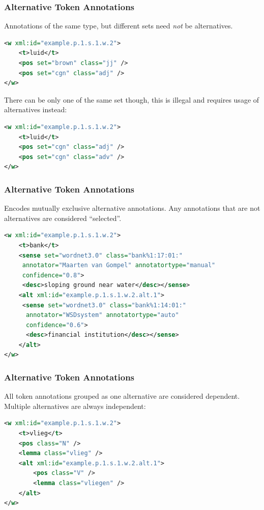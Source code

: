 \documentclass[compress,10pt]{beamer}
\begin{document}
\begin{frame}[fragile]
\frametitle{Alternative Token Annotations}

Annotations of the same type, but different sets need \emph{not} be alternatives.

\begin{lstlisting}[language=xml]
<w xml:id="example.p.1.s.1.w.2">
    <t>luid</t>
    <pos set="brown" class="jj" />
    <pos set="cgn" class="adj" />
</w>                         
\end{lstlisting}        

There can be only one of the same set though, this is illegal and requires usage of alternatives instead:

\begin{lstlisting}[language=xml]
<w xml:id="example.p.1.s.1.w.2">
    <t>luid</t>
    <pos set="cgn" class="adj" />
    <pos set="cgn" class="adv" />
</w>                         
\end{lstlisting}   

\end{frame}


\begin{frame}[fragile]
\frametitle{Alternative Token Annotations}

Encodes mutually exclusive alternative annotations. Any annotations that are not alternatives are considered ``selected''.

\begin{lstlisting}[language=xml]
<w xml:id="example.p.1.s.1.w.2">
    <t>bank</t>
    <sense set="wordnet3.0" class="bank%1:17:01:"    
     annotator="Maarten van Gompel" annotatortype="manual" 
     confidence="0.8">
     <desc>sloping ground near water</desc></sense>
    <alt xml:id="example.p.1.s.1.w.2.alt.1">
     <sense set="wordnet3.0" class="bank%1:14:01:"
      annotator="WSDsystem" annotatortype="auto" 
      confidence="0.6">     
      <desc>financial institution</desc></sense> 
    </alt>
</w>                         
\end{lstlisting}        

\end{frame}

\begin{frame}[fragile]
\frametitle{Alternative Token Annotations}

All token annotations grouped as one alternative are considered dependent. Multiple alternatives are always independent:

\begin{lstlisting}[language=xml]
<w xml:id="example.p.1.s.1.w.2">
    <t>vlieg</t>
    <pos class="N" />
    <lemma class="vlieg" />
    <alt xml:id="example.p.1.s.1.w.2.alt.1">
        <pos class="V" />
        <lemma class="vliegen" />
    </alt>
</w>                         
\end{lstlisting}        

\end{frame}
\end{document}
